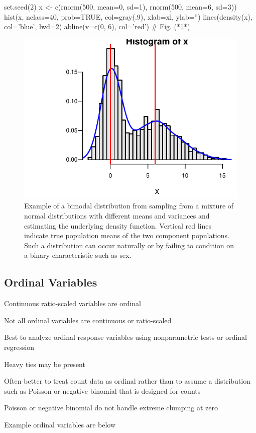 \begin{Schunk}
\begin{Sinput}
set.seed(2)
x <- c(rnorm(500, mean=0, sd=1), rnorm(500, mean=6, sd=3))
hist(x, nclass=40, prob=TRUE, col=gray(.9), xlab=xl, ylab='')
lines(density(x), col='blue', lwd=2)
abline(v=c(0, 6), col='red')   # Fig. (*\ref{fig:descript-bimode}*)
\end{Sinput}
\begin{figure}[htbp]

\centerline{\includegraphics{descript-bimode-1} }

\caption[Bimodal distribution]{Example of a bimodal distribution from sampling from a mixture of normal distributions with different means and variances and estimating the underlying density function.  Vertical red lines indicate true population means of the two component populations.  Such a distribution can occur naturally or by failing to condition on a binary characteristic such as sex.}\label{fig:descript-bimode}
\end{figure}
\end{Schunk}

\subsection{Ordinal Variables}
\bi
\item Continuous ratio-scaled variables are ordinal
\item Not all ordinal variables are continuous or ratio-scaled
\item Best to analyze ordinal response variables using nonparametric tests or ordinal regression
\item Heavy ties may be present
\item Often better to treat count data as ordinal rather than to assume a distribution such as Poisson or negative binomial that is designed for counts
 \bi
 \item Poisson or negative binomial do not handle extreme clumping at zero
 \ei
\item Example ordinal variables are below
\ei

